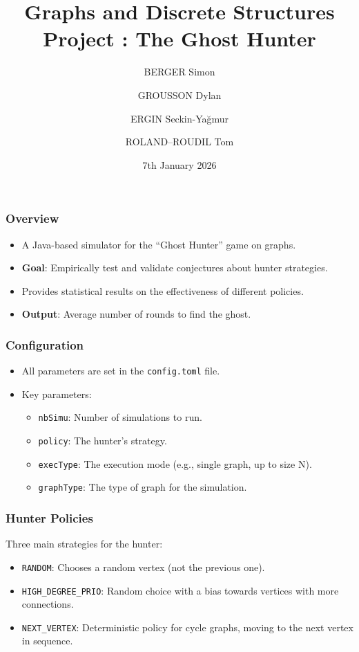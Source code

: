 \documentclass{beamer}
\title{Graphs and Discrete Structures Project : The Ghost Hunter}
\author{BERGER Simon \and GROUSSON Dylan \and ERGIN Seckin-Yağmur \and ROLAND--ROUDIL Tom}
\date{7th January 2026}
\begin{document}
\begin{frame}
\titlepage
\end{frame}

\begin{frame}
\frametitle{Overview}
\begin{itemize}
    \item A Java-based simulator for the ``Ghost Hunter'' game on graphs.
    \item \textbf{Goal}: Empirically test and validate conjectures about hunter strategies.
    \item Provides statistical results on the effectiveness of different policies.
    \item \textbf{Output}: Average number of rounds to find the ghost.
\end{itemize}
\end{frame}

\begin{frame}
\frametitle{Configuration}
\begin{itemize}
    \item All parameters are set in the \texttt{config.toml} file.
    \item Key parameters:
    \begin{itemize}
        \item \texttt{nbSimu}: Number of simulations to run.
        \item \texttt{policy}: The hunter's strategy.
        \item \texttt{execType}: The execution mode (e.g., single graph, up to size N).
        \item \texttt{graphType}: The type of graph for the simulation.
    \end{itemize}
\end{itemize}
\end{frame}

\begin{frame}
\frametitle{Hunter Policies}
Three main strategies for the hunter:
\begin{itemize}
    \item \texttt{RANDOM}: Chooses a random vertex (not the previous one).
    \item \texttt{HIGH\_DEGREE\_PRIO}: Random choice with a bias towards vertices with more connections.
    \item \texttt{NEXT\_VERTEX}: Deterministic policy for cycle graphs, moving to the next vertex in sequence.
\end{itemize}
\end{frame}
\end{document}
